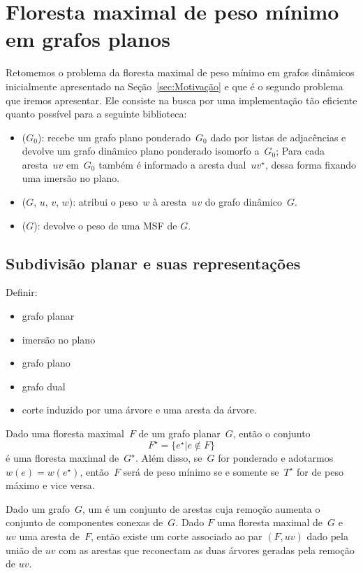 \chapter{Floresta maximal de peso mínimo em grafos planos}
\label{sec:MSF}


Retomemos o problema da floresta maximal de peso mínimo em grafos dinâmicos inicialmente apresentado na Seção~\ref{sec:Motivação} e que é o segundo problema que iremos apresentar.
Ele consiste na busca por uma implementação tão eficiente quanto possível para a seguinte biblioteca:

\begin{itemize}
\item \MSFCreate($G_0$): recebe um grafo plano ponderado~$G_0$ dado por listas de adjacências e devolve um grafo dinâmico plano ponderado isomorfo a~$G_0$; Para cada aresta~$uv$ em~$G_0$ também é informado a aresta dual~$uv^\star$, dessa forma fixando uma imersão no plano.
\item \MSFupdate($G$, $u$, $v$, $w$): atribui o peso~$w$ à aresta~$uv$ do grafo dinâmico~$G$.
\item \MSFweight($G$): devolve o peso de uma MSF de $G$.
\end{itemize}


\section{Subdivisão planar e suas representações}

Definir:
\begin{itemize}
\item grafo planar
\item imersão no plano
\item grafo plano
\item grafo dual
\item corte induzido por uma árvore e uma aresta da árvore.
\end{itemize}

\begin{theorem}
\label{teo:MSFdual}
Dado uma floresta maximal~$F$ de um grafo planar~$G$, então o conjunto
$$
F^\star = \{e^\star|e\notin F\}
$$
é uma floresta maximal de~$G^\star$.
Além disso, se~$G$ for ponderado e adotarmos $w(e) = w(e^\star)$, então~$F$ será de peso mínimo se e somente se~$T^\star$ for de peso máximo e vice versa.
\end{theorem}


Dado um grafo~$G$, um  é um conjunto de arestas cuja remoção aumenta o conjunto de componentes conexas de~$G$.
Dado $F$ uma floresta maximal de~$G$ e~$uv$ uma aresta de~$F$, então existe um corte associado ao par $(F, uv)$ dado pela união de $uv$ com as arestas que reconectam as duas árvores geradas pela remoção de $uv$.


